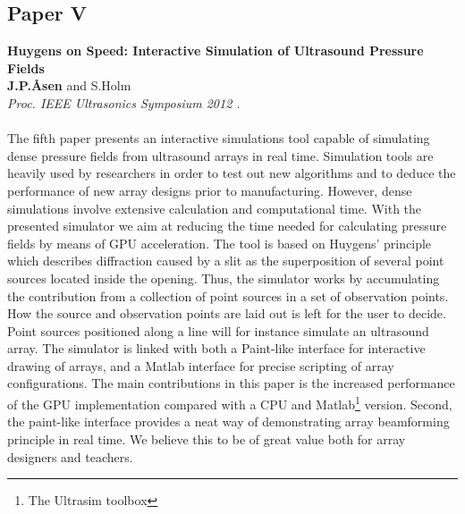 \subsection{Paper V}
\textbf{Huygens on Speed: Interactive Simulation of Ultrasound Pressure Fields}\\
\textbf{J.\:P.\:\AA{}sen} and S.\:Holm\\
{\it Proc. IEEE Ultrasonics Symposium 2012 .}\\\\
The fifth paper presents an interactive simulations tool capable of simulating dense pressure fields from ultrasound arrays in real time. Simulation tools are heavily used by researchers in order to test out new algorithms and to deduce the performance of new array designs prior to manufacturing. However, dense simulations involve extensive calculation and computational time. With the presented simulator we aim at reducing the time needed for calculating pressure fields by means of GPU acceleration. The tool is based on Huygens' principle which describes diffraction caused by a slit as the superposition of several point sources located inside the opening. Thus, the simulator works by accumulating the contribution from a collection of point sources in a set of observation points. How the source and observation points are laid out is left for the user to decide. Point sources positioned along a line will for instance simulate an ultrasound array. The simulator is linked with both a Paint-like interface for interactive drawing of arrays, and a Matlab interface for precise scripting of array configurations. The main contributions in this paper is the increased performance of the GPU implementation compared with a CPU and Matlab\footnote{The Ultrasim toolbox } version. Second, the paint-like interface provides a neat way of demonstrating array beamforming principle in real time. We believe this to be of great value both for array designers and teachers.

